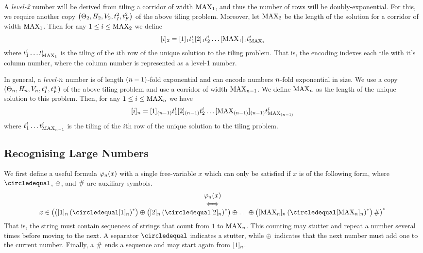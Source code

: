 A \emph{level-2} number will be derived from tiling a corridor of width $\nmax{1}$, and thus the number of rows will be doubly-exponential.
For this, we require another copy
$\tup{\tilesnum{2}, \hrelnum{2}, \vrelnum{2}, \inittilenum{2}, \fintilenum{2}}$
of the above tiling problem.
Moreover, let $\nmax{2}$ be the length of the solution for a corridor of width $\nmax{1}$.
Then for any
$1 \leq i \leq \nmax{2}$
we define
\[
    \tenc{2}{i} =
        \tenc{1}{1} \tile^i_1
        \tenc{1}{2} \tile^i_2
        \ldots
        \tenc{1}{\nmax{1}} \tile^i_{\nmax{1}}
\]
where
$\tile^i_1 \ldots \tile^i_{\nmax{1}}$
is the tiling of the $i$th row of the unique solution to the tiling problem.
That is, the encoding indexes each tile with it's column number, where the column number is represented as a level-1 number.

In general, a \emph{level-$\expheight$} number is of length $(\expheight-1)$-fold exponential and can encode numbers $\expheight$-fold exponential in size.
We use a copy
$\tup{\tilesnum{\expheight},
      \hrelnum{\expheight},
      \vrelnum{\expheight},
      \inittilenum{\expheight},
      \fintilenum{\expheight}}$
of the above tiling problem and use a corridor of width
$\nmax{\expheight-1}$.
We define $\nmax{\expheight}$ as the length of the unique solution to this problem.
Then, for any $1 \leq i \leq \nmax{\expheight}$ we have
\[
    \tenc{\expheight}{i} =
        \tenc{(\expheight-1)}{1} \tile^i_1
        \tenc{(\expheight-1)}{2} \tile^i_2
        \ldots
        \tenc{(\expheight-1)}{\nmax{(\expheight-1)}} \tile^i_{\nmax{(\expheight-1)}}
\]
where
$\tile^i_1 \ldots \tile^i_{\nmax{\expheight-1}}$
is the tiling of the $i$th row of the unique solution to the tiling problem.

\subsection{Recognising Large Numbers}

We first define a useful formula
$\goodnums{\expheight}{x}$
with a single free-variable $x$ which can only be satisfied if $x$ is of the following form, where
$\numeq$, $\numplus$, and $\numsep$
are auxiliary symbols.
\[
    \begin{array}{c}
        \goodnums{\expheight}{x} \\
        \iff \\
        x \in \brac{
            \brac{\tenc{\expheight}{1} \brac{\numeq \tenc{\expheight}{1}}^\ast}
            \numplus
            \brac{\tenc{\expheight}{2} \brac{\numeq \tenc{\expheight}{2}}^\ast}
            \numplus
            \ldots
            \numplus
            \brac{
                \tenc{\expheight}{\nmax{\expheight}}
                    \brac{\numeq \tenc{\expheight}{\nmax{\expheight}}}^\ast
            }
            \numsep
        }^\ast
    \end{array}
\]
That is, the string must contain sequences of strings that count from $1$ to $\nmax{\expheight}$.
This counting may stutter and repeat a number several times before moving to the next.
A separator $\numeq$ indicates a stutter, while $\numplus$ indicates that the next number must add one to the current number.
Finally, a $\numsep$ ends a sequence and may start again from $\tenc{\expheight}{1}$.

